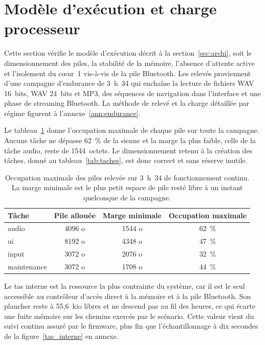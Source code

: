 \section{Modèle d'exécution et charge processeur}
\label{sec:res_execution}

Cette section vérifie le modèle d'exécution décrit à la section~\ref{sec:archi}, soit le dimensionnement des piles, la stabilité de la mémoire, l'absence d'attente active et l'isolement du cœur~1 vis-à-vis de la pile Bluetooth. Les relevés proviennent d'une campagne d'endurance de 3~h~34 qui enchaîne la lecture de fichiers WAV 16~bits, WAV 24~bits et MP3, des séquences de navigation dans l'interface et une phase de streaming Bluetooth. La méthode de relevé et la charge détaillée par régime figurent à l'annexe~\ref{ann:endurance}.

Le tableau~\ref{tab:piles} donne l'occupation maximale de chaque pile sur toute la campagne. Aucune tâche ne dépasse 62~\% de la sienne et la marge la plus faible, celle de la tâche audio, reste de 1544~octets. Le dimensionnement retenu à la création des tâches, donné au tableau~\ref{tab:taches}, est donc correct et sans réserve inutile.

\begin{table}[H]
    \centering
    \renewcommand{\arraystretch}{1.25}
    \caption{Occupation maximale des piles relevée sur 3~h~34 de fonctionnement continu. La marge minimale est le plus petit espace de pile resté libre à un instant quelconque de la campagne.}
    \label{tab:piles}
    \footnotesize
    \begin{tabular}{lccc}
        \toprule
        Tâche       & Pile allouée & Marge minimale & Occupation maximale \\
        \midrule
        audio       & 4096 o       & 1544 o         & 62~\%               \\
        ui          & 8192 o       & 4348 o         & 47~\%               \\
        input       & 3072 o       & 2076 o         & 32~\%               \\
        maintenance & 3072 o       & 1708 o         & 44~\%               \\
        \bottomrule
    \end{tabular}
\end{table}

Le tas interne est la ressource la plus contrainte du système, car il est le seul accessible au contrôleur d'accès direct à la mémoire et à la pile Bluetooth. Son plancher reste à 55,6~kio libres et ne descend pas au fil des heures, ce qui écarte une fuite mémoire sur les chemins exercés par le scénario. Cette valeur vient du suivi continu assuré par le firmware, plus fin que l'échantillonnage à dix secondes de la figure~\ref{tas_interne} en annexe.

